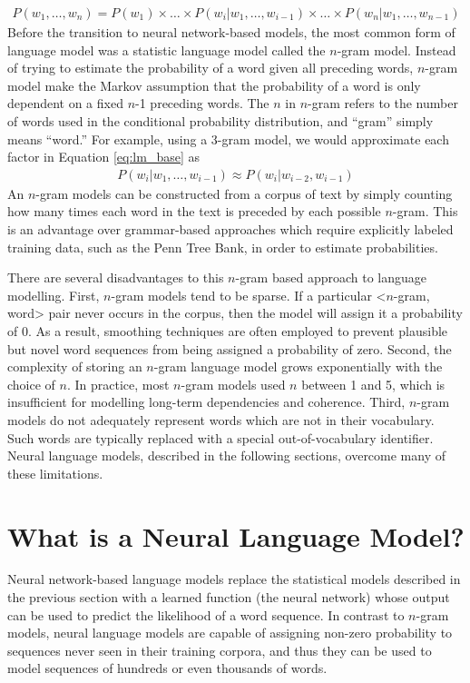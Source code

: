 \begin{align}
    \label{eq:lm_base}
    P(w_1, \ldots, w_n) = P(w_1) \times \ldots \times P(w_i | w_1, \ldots, w_{i-1}) \times \ldots \times P(w_n | w_1, \ldots, w_{n-1})
\end{align}
Before the transition to neural network-based models, the most common form of language model was a statistic language model called the $n$-gram model.
Instead of trying to estimate the probability of a word given all preceding words, $n$-gram model make the Markov assumption that the probability of a word is only dependent on a fixed $n$-1 preceding words. The $n$ in $n$-gram refers to the number of words used in the conditional probability distribution, and ``gram'' simply means ``word.''
For example, using a 3-gram model, we would approximate each factor in Equation \ref{eq:lm_base} as
\begin{align}
   P(w_i | w_1, \ldots, w_{i-1}) \approx P(w_i | w_{i-2}, w_{i-1})
\end{align}
An $n$-gram models can be constructed from a corpus of text by simply counting how many times each word in the text is preceded by each possible $n$-gram.
This is an advantage over grammar-based approaches which require explicitly labeled training data, such as the Penn Tree Bank, in order to estimate probabilities.

There are several disadvantages to this $n$-gram based approach to language modelling.
First, $n$-gram models tend to be sparse.
If a particular <$n$-gram, word> pair never occurs in the corpus, then the model will assign it a probability of 0.
As a result, smoothing techniques are often employed to prevent plausible but novel word sequences from being assigned a probability of zero.
Second, the complexity of storing an $n$-gram language model grows exponentially with the choice of $n$.
In practice, most $n$-gram models used $n$ between 1 and 5, which is insufficient for modelling long-term dependencies and coherence.
Third, $n$-gram models do not adequately represent words which are not in their vocabulary.
Such words are typically replaced with a special out-of-vocabulary identifier.
Neural language models, described in the following sections, overcome many of these limitations.


\section{What is a Neural Language Model?}

Neural network-based language models replace the statistical models described in the previous section with a learned function (the neural network) whose output can be used to predict the likelihood of a word sequence.
In contrast to $n$-gram models, neural language models are capable of assigning non-zero probability to sequences never seen in their training corpora, and thus they can be used to model sequences of hundreds or even thousands of words.

